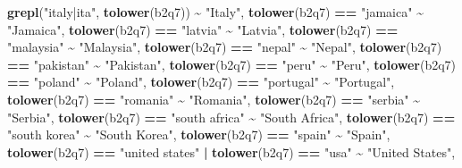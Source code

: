 \documentclass[
]{article}
\newenvironment{Shaded}{\begin{snugshade}}{\end{snugshade}}
\newcommand{\FunctionTok}[1]{\textcolor[rgb]{0.13,0.29,0.53}{\textbf{#1}}}
\newcommand{\NormalTok}[1]{#1}
\newcommand{\SpecialCharTok}[1]{\textcolor[rgb]{0.81,0.36,0.00}{\textbf{#1}}}
\newcommand{\StringTok}[1]{\textcolor[rgb]{0.31,0.60,0.02}{#1}}
\begin{document}
\begin{Shaded}
\begin{Highlighting}[]
    \FunctionTok{grepl}\NormalTok{(}\StringTok{"italy|ita"}\NormalTok{, }\FunctionTok{tolower}\NormalTok{(b2q7))                 }\SpecialCharTok{\textasciitilde{}} \StringTok{"Italy"}\NormalTok{,}
    \FunctionTok{tolower}\NormalTok{(b2q7) }\SpecialCharTok{==} \StringTok{"jamaica"}                        \SpecialCharTok{\textasciitilde{}} \StringTok{"Jamaica"}\NormalTok{,}
    \FunctionTok{tolower}\NormalTok{(b2q7) }\SpecialCharTok{==} \StringTok{"latvia"}                         \SpecialCharTok{\textasciitilde{}} \StringTok{"Latvia"}\NormalTok{,}
    \FunctionTok{tolower}\NormalTok{(b2q7) }\SpecialCharTok{==} \StringTok{"malaysia"}                       \SpecialCharTok{\textasciitilde{}} \StringTok{"Malaysia"}\NormalTok{,}
    \FunctionTok{tolower}\NormalTok{(b2q7) }\SpecialCharTok{==} \StringTok{"nepal"}                          \SpecialCharTok{\textasciitilde{}} \StringTok{"Nepal"}\NormalTok{,}
    \FunctionTok{tolower}\NormalTok{(b2q7) }\SpecialCharTok{==} \StringTok{"pakistan"}                       \SpecialCharTok{\textasciitilde{}} \StringTok{"Pakistan"}\NormalTok{,}
    \FunctionTok{tolower}\NormalTok{(b2q7) }\SpecialCharTok{==} \StringTok{"peru"}                           \SpecialCharTok{\textasciitilde{}} \StringTok{"Peru"}\NormalTok{,}
    \FunctionTok{tolower}\NormalTok{(b2q7) }\SpecialCharTok{==} \StringTok{"poland"}                         \SpecialCharTok{\textasciitilde{}} \StringTok{"Poland"}\NormalTok{,}
    \FunctionTok{tolower}\NormalTok{(b2q7) }\SpecialCharTok{==} \StringTok{"portugal"}                       \SpecialCharTok{\textasciitilde{}} \StringTok{"Portugal"}\NormalTok{,}
    \FunctionTok{tolower}\NormalTok{(b2q7) }\SpecialCharTok{==} \StringTok{"romania"}                        \SpecialCharTok{\textasciitilde{}} \StringTok{"Romania"}\NormalTok{,}
    \FunctionTok{tolower}\NormalTok{(b2q7) }\SpecialCharTok{==} \StringTok{"serbia"}                         \SpecialCharTok{\textasciitilde{}} \StringTok{"Serbia"}\NormalTok{,}
    \FunctionTok{tolower}\NormalTok{(b2q7) }\SpecialCharTok{==} \StringTok{"south africa"}                   \SpecialCharTok{\textasciitilde{}} \StringTok{"South Africa"}\NormalTok{,}
    \FunctionTok{tolower}\NormalTok{(b2q7) }\SpecialCharTok{==} \StringTok{"south korea"}                    \SpecialCharTok{\textasciitilde{}} \StringTok{"South Korea"}\NormalTok{,}
    \FunctionTok{tolower}\NormalTok{(b2q7) }\SpecialCharTok{==} \StringTok{"spain"}                          \SpecialCharTok{\textasciitilde{}} \StringTok{"Spain"}\NormalTok{,}
    \FunctionTok{tolower}\NormalTok{(b2q7) }\SpecialCharTok{==} \StringTok{"united states"} \SpecialCharTok{|} \FunctionTok{tolower}\NormalTok{(b2q7) }\SpecialCharTok{==} \StringTok{"usa"} \SpecialCharTok{\textasciitilde{}} \StringTok{"United States"}\NormalTok{,}

\end{Highlighting}
\end{Shaded}
\end{document}
